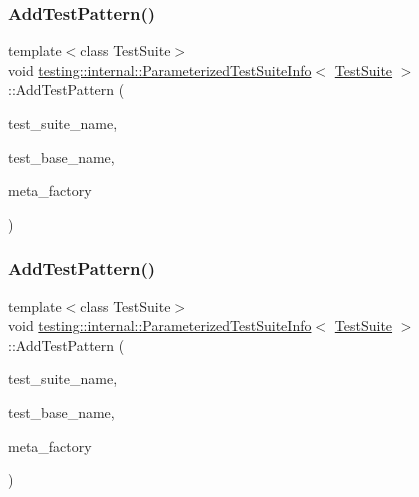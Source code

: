 \subsubsection{\texorpdfstring{AddTestPattern()}{AddTestPattern()}\hspace{0.1cm}{\footnotesize\ttfamily [1/2]}}
{\footnotesize\ttfamily template$<$class Test\+Suite$>$ \\
void \mbox{\hyperlink{classtesting_1_1internal_1_1_parameterized_test_suite_info}{testing\+::internal\+::\+Parameterized\+Test\+Suite\+Info}}$<$ \mbox{\hyperlink{classtesting_1_1_test_suite}{Test\+Suite}} $>$\+::Add\+Test\+Pattern (\begin{DoxyParamCaption}\item[{const char $\ast$}]{test\+\_\+suite\+\_\+name,  }\item[{const char $\ast$}]{test\+\_\+base\+\_\+name,  }\item[{\mbox{\hyperlink{classtesting_1_1internal_1_1_test_meta_factory_base}{Test\+Meta\+Factory\+Base}}$<$ \mbox{\hyperlink{classtesting_1_1internal_1_1_parameterized_test_suite_info_a10761bd750a6820a8d8d2c654b10fe54}{Param\+Type}} $>$ $\ast$}]{meta\+\_\+factory }\end{DoxyParamCaption})\hspace{0.3cm}{\ttfamily [inline]}}

\mbox{\label{classtesting_1_1internal_1_1_parameterized_test_suite_info_a07445ac68713383f38747e1c56c6a04a}} 
\subsubsection{\texorpdfstring{AddTestPattern()}{AddTestPattern()}\hspace{0.1cm}{\footnotesize\ttfamily [2/2]}}
{\footnotesize\ttfamily template$<$class Test\+Suite$>$ \\
void \mbox{\hyperlink{classtesting_1_1internal_1_1_parameterized_test_suite_info}{testing\+::internal\+::\+Parameterized\+Test\+Suite\+Info}}$<$ \mbox{\hyperlink{classtesting_1_1_test_suite}{Test\+Suite}} $>$\+::Add\+Test\+Pattern (\begin{DoxyParamCaption}\item[{const char $\ast$}]{test\+\_\+suite\+\_\+name,  }\item[{const char $\ast$}]{test\+\_\+base\+\_\+name,  }\item[{\mbox{\hyperlink{classtesting_1_1internal_1_1_test_meta_factory_base}{Test\+Meta\+Factory\+Base}}$<$ \mbox{\hyperlink{classtesting_1_1internal_1_1_parameterized_test_suite_info_a10761bd750a6820a8d8d2c654b10fe54}{Param\+Type}} $>$ $\ast$}]{meta\+\_\+factory }\end{DoxyParamCaption})\hspace{0.3cm}{\ttfamily [inline]}}

